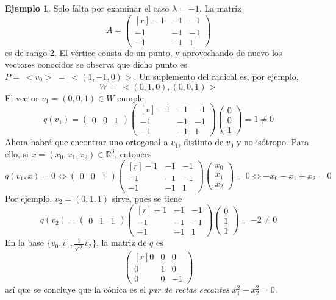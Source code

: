 \documentclass[12pt]{report}
\theoremstyle{definition}
\theoremstyle{definition}
\newtheorem{example}{Ejemplo}[chapter]
\theoremstyle{remark}
\newcommand{\R}{\mathbb R}
\begin{document}
\begin{example}
\vspace{2mm}
\noindent
Solo falta por examinar el caso $\lambda = -1$. La matriz
\[A = \begin{pmatrix*}[r]
    -1 & -1 & -1 \\
    -1 & -1 & -1 \\
    -1 & -1 & 1
\end{pmatrix*}\]
es de rango 2. El vértice consta de un punto, y aprovechando de nuevo los vectores conocidos se observa que dicho punto es $P = \ <v_0> \ = \ <(1,-1,0)>$. Un suplemento del radical es, por ejemplo,
\[W = \ <(0,1,0),(0,0,1)>\]
El vector $v_1 = (0,0,1) \in W$ cumple
\[q(v_1) = \begin{pmatrix}
    0 & 0 & 1
\end{pmatrix} \begin{pmatrix*}[r]
    -1 & -1 & -1 \\
    -1 & -1 & -1 \\
    -1 & -1 & 1
\end{pmatrix*} \begin{pmatrix}
    0 \\
    0 \\
    1
\end{pmatrix} = 1 \neq 0\]
Ahora habrá que encontrar uno ortogonal a $v_1$, distinto de $v_0$ y no isótropo. Para ello, si $x = (x_0,x_1,x_2) \in \R^3$, entonces
\[q(v_1,x) = 0 \iff \begin{pmatrix}
    0 & 0 & 1
\end{pmatrix} \begin{pmatrix*}[r]
    -1 & -1 & -1 \\
    -1 & -1 & -1 \\
    -1 & -1 & 1
\end{pmatrix*} \begin{pmatrix}
    x_0 \\
    x_1 \\
    x_2
\end{pmatrix} = 0 \iff -x_0-x_1+x_2=0\]
Por ejemplo, $v_2 = (0,1,1)$ sirve, pues se tiene
\[q(v_2) = \begin{pmatrix}
    0 & 1 & 1
\end{pmatrix} \begin{pmatrix*}[r]
    -1 & -1 & -1 \\
    -1 & -1 & -1 \\
    -1 & -1 & 1
\end{pmatrix*} \begin{pmatrix}
    0 \\
    1 \\
    1
\end{pmatrix} = -2 \neq 0\]
En la base $\{v_0,v_1,\frac{1}{\sqrt{2}} v_2\}$, la matriz de $q$ es
\[\begin{pmatrix*}[r]
    0 & 0 & 0 \\
    0 & 1 & 0 \\
    0 & 0 & -1
\end{pmatrix*}\]
así que se concluye que la cónica es el \textit{par de rectas secantes} $x_1^2-x_2^2=0$.
\end{example}
\end{document}
